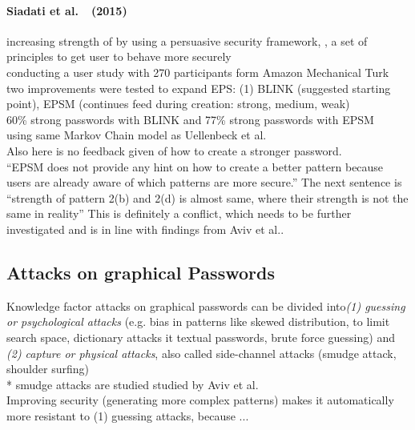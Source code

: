 \documentclass[twocolumn, a4paper, 10pt]{article}
\begin{document}
\paragraph{Siadati et al.~\cite{siadati2015fortifying}~(2015)}
increasing strength of by using a persuasive security framework\cite{forget2007persuasion}, \cite{forget2008persuasion}, a set of principles to get user to behave more securely\\
conducting a user study with 270 participants form Amazon Mechanical Turk\\
two improvements were tested to expand EPS: (1) BLINK (suggested starting point), EPSM (continues feed during creation: strong, medium, weak)\\
60\% strong passwords with BLINK and 77\% strong passwords with EPSM\\
using same Markov Chain model as Uellenbeck et al.\cite{Uellenbeck:2013:QSG:2508859.2516700}\\
Also here is no feedback given of how to create a stronger password.\\
``EPSM does not provide any hint on how to create a better pattern because users are already aware of which patterns are more secure.'' The next sentence is ``strength of pattern 2(b) and 2(d) is almost same, where their strength is not the same in reality'' This is definitely a conflict, which needs to be further investigated and is in line with findings from Aviv et al.\cite{Aviv:2014:UVP:2664243.2664253}.

\subsection{Attacks on graphical Passwords}
\label{sec:related:attacks}
Knowledge factor attacks on graphical passwords can be divided into\textit{(1) guessing or psychological attacks} (e.g. bias in patterns like skewed distribution, to limit search space, dictionary attacks it textual passwords, brute force guessing) and \textit{(2) capture or physical attacks}, also called side-channel attacks (smudge attack, shoulder surfing)\\
* smudge attacks are studied  studied by Aviv et al. \cite{Aviv:2010:SAS:1925004.1925009}\\
Improving security (generating more complex patterns) makes it automatically more resistant to (1) guessing attacks, because ... 
\end{document}
